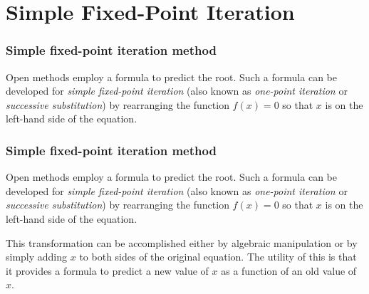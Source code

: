 \documentclass{if-beamer}
\begin{document}
\section{Simple Fixed-Point Iteration}
\begin{frame}[t]
\frametitle{Simple fixed-point iteration method}
Open methods employ a formula to predict the root. Such a formula can
be developed for \textit{simple fixed-point iteration} (also known as \textit{one-point iteration} or \textit{successive substitution}) by rearranging the function $f(x) = 0$ so that $x$ is on the left-hand
side of the equation. \\\vspace{7pt}

\end{frame}

\begin{frame}[t]
\frametitle{Simple fixed-point iteration method}
Open methods employ a formula to predict the root. Such a formula can
be developed for \textit{simple fixed-point iteration} (also known as \textit{one-point iteration} or \textit{successive substitution}) by rearranging the function $f(x) = 0$ so that $x$ is on the left-hand
side of the equation. \\\vspace{7pt}

This transformation can be accomplished either by algebraic manipulation or by simply adding $x$ to both sides of the original equation. The utility of this is that it provides a formula to predict a new value of $x$ as a function of an old value of $x$.  \\\vspace{7pt}

\end{frame}
\end{document}
